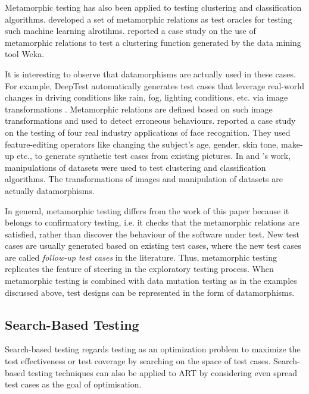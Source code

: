 \documentclass[preprint,1p,authoryear,times]{elsarticle}
\begin{document}
Metamorphic testing has also been applied to testing clustering and classification algorithms. \citet{TestingClassifier2011} developed a set of metamorphic relations as test oracles for testing such machine learning alrotihms. \citet{Yang2019} reported a case study on the use of metamorphic relations to test a clustering function generated by the data mining tool Weka. 

It is interesting to observe that datamorphisms are actually used in these cases. For example, DeepTest automatically generates test cases that leverage real-world changes in driving conditions like rain, fog, lighting conditions, etc. via image transformations \citep{DeepTest2018}. Metamorphic relations are defined based on such image transformations and used to detect erroneous behaviours. \citet{Datamorphic2019} reported a case study on the testing of four real industry applications of face recognition. They used feature-editing operators like changing the subject's age, gender, skin tone, make-up etc., to generate synthetic test cases from existing pictures. In \citet{TestingClassifier2011} and \citet{Yang2019}'s work, manipulations of datasets were used to test clustering and classification algorithms. The transformations of images and manipulation of datasets are actually datamorphisms. 

In general, metamorphic testing differs from the work of this paper because it belongs to confirmatory testing, i.e. it checks that the metamorphic relations are satisfied, rather than discover the behaviour of the software under test. New test cases are usually generated based on existing test cases, where the new test cases are called \emph{follow-up test cases} in the literature. Thus, metamorphic testing replicates the feature of steering in the exploratory testing process. When metamorphic testing is combined with data mutation testing as in the examples discussed above, test designs can be represented in the form of datamorphisms. 

\subsection{Search-Based Testing}

Search-based testing regards testing as an optimization problem \citep{SearchBasedSESurveyHarman2012, SearchBaseTestingSurvey2015} to maximize the test effectiveness or test coverage by searching on the space of test cases. Search-based testing techniques can also be applied to ART by considering even spread test cases as the goal of optimisation. 
\end{document}
